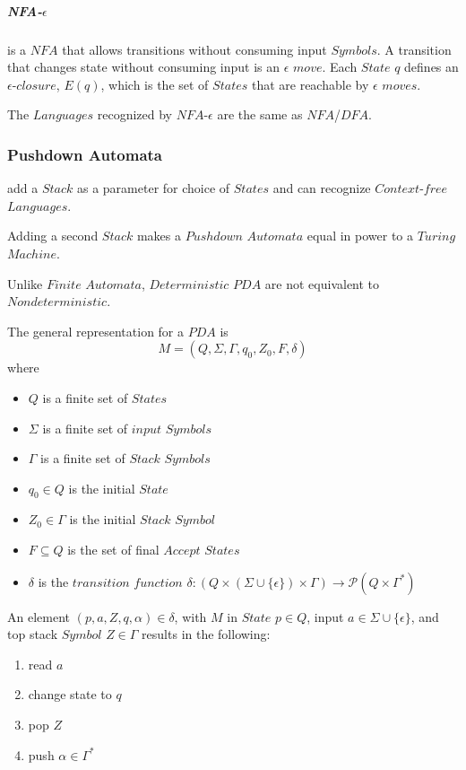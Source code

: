 \documentclass{article}
\begin{document}
\subparagraph{NFA-$\epsilon$} is a $NFA$ that allows transitions
without consuming input $Symbols$. A transition that changes state
without consuming input is an $\epsilon$ $move$. Each $State$ $q$
defines an $\epsilon$-$closure$, $E(q)$, which is the set of $States$
that are reachable by $\epsilon$ $moves$.

The $Languages$ recognized by $NFA$-$\epsilon$ are the same as
$NFA$/$DFA$.

\subsubsection{Pushdown Automata} add a $Stack$ as a parameter for
choice of $States$ and can recognize $Context$-$free$ $Languages$.

Adding a second $Stack$ makes a $Pushdown$ $Automata$ equal in power
to a $Turing$ $Machine$.

Unlike $Finite$ $Automata$, $Deterministic$ $PDA$ are not equivalent
to $Nondeterministic$.

The general representation for a $PDA$ is
\[
    M = (Q, \Sigma, \Gamma, q_0, Z_0, F, \delta)
\]
where
\begin{itemize}
\item $Q$ is a finite set of $States$
\item $\Sigma$ is a finite set of $input$ $Symbols$
\item $\Gamma$ is a finite set of $Stack$ $Symbols$
\item $q_0 \in Q$ is the initial $State$
\item $Z_0 \in \Gamma$ is the initial $Stack$ $Symbol$
\item $F \subseteq Q$ is the set of final $Accept$ $States$
\item $\delta$ is the $transition$ $function$ $\delta:
(Q \times (\Sigma \cup \{\epsilon\}) \times \Gamma) \rightarrow
\mathcal{P}(Q \times \Gamma^*)$
\end{itemize}

An element $(p,a,Z,q,\alpha)\in\delta$, with $M$ in $State$ $p \in Q$,
input $a \in \Sigma \cup \{\epsilon\}$, and top stack $Symbol$ $Z \in
\Gamma$ results in the following:
\begin{enumerate}
\item read $a$
\item change state to $q$
\item pop $Z$
\item push $\alpha \in \Gamma^*$
\end{enumerate}
\end{document}
